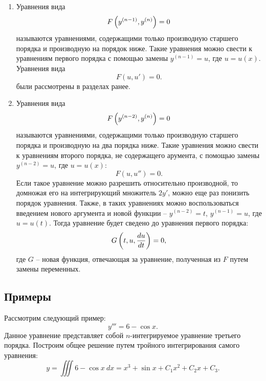 \begin{enumerate}
		\item Уравнения вида
			\[ F\left( y^{(n-1)}, y^{(n)} \right) = 0 \]
			называются уравнениями, содержащими только производную старшего порядка и производную на порядок ниже. Такие уравнения можно свести к уравнениям первого порядка с помощью замены $y^{(n-1)} = u$, где $u = u(x)$. Уравнения вида 
			\[ F(u, u') = 0. \]
			были рассмотрены в разделах ранее.

		\item Уравнения вида
			\[ F\left( y^{(n-2)}, y^{(n)} \right) = 0 \]
			называются уравнениями, содержащими только производную старшего порядка и производную на два порядка ниже. Такие уравнения можно свести к уравнениям второго порядка, не содержащего арумента, с помощью замены $y^{(n-2)} = u$, где $u = u(x)$:
			\[ F(u, u'') = 0. \]
			Если такое уравнение можно разрешить относительно производной, то домножая его на интегрирующий множитель $2y'$, можно еще раз понизить порядок уравнения. Также, в таких уравнениях можно воспользоваться введением нового аргумента и новой функции -- $y^{(n-2)} = t$, $y^{(n-1)} = u$, где $u = u(t)$. Тогда уравнение будет сведено до уравнения первого порядка:
			\[ G\left( t, u, \dfrac{d u}{d t} \right) = 0, \] 
			где $G$ -- новая функция, отвечающая за уравнение, полученная из $F$ путем замены переменных.

	\end{enumerate}

	\subsection{Примеры}

		Рассмотрим следующий пример:
		\[ y''' = 6 - \cos{x}. \]
		Данное уравнение представляет собой $n$-интегрируемое уравнение третьего порядка. Построим общее решение путем тройного интегрирования самого уравнения:
		\[ y = \iiint 6 - \cos{x} ~ dx = x^3 + \sin{x} + C_1x^2 + C_2x + C_3. \]

